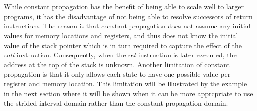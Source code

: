 \documentclass{kththesis}
\renewcommand{\it}[1]{\textit{#1}}
\begin{document}
\\ \\
While constant propagation has the benefit of being able to scale well to larger programs\cite{alternating}, it has the disadvantage of not being able to resolve successors of return instructions. The reason is that constant propagation does not assume any initial values for memory locations and registers, and thus does not know the initial value of the stack pointer which is in turn required to capture the effect of the \it{call} instruction. Consequently, when the \it{ret} instruction is later executed, the address at the top of the stack is unknown. Another limitation of constant propagation is that it only allows each state to have one possible value per register and memory location. This limitation will be illustrated by the example in the next section where it will be shown when it can be more appropriate to use the strided interval domain rather than the constant propagation domain.
\end{document}
